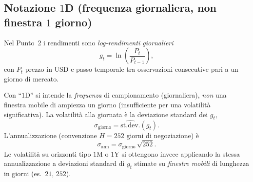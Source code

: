 
\subsection*{Notazione $1$D (frequenza giornaliera, non finestra $1$ giorno)}
Nel Punto~2 i rendimenti sono \emph{log-rendimenti giornalieri}
\[
  g_t = \ln\!\left(\frac{P_t}{P_{t-1}}\right),
\]
con $P_t$ prezzo in USD e passo temporale tra osservazioni consecutive pari a un giorno di mercato.

Con ``$1$D'' si intende la \emph{frequenza} di campionamento (giornaliera), \emph{non} una finestra mobile di ampiezza un giorno (insufficiente per una volatilità significativa). La volatilità alla giornata è la deviazione standard dei $g_t$,
\[
  \sigma_{\mathrm{giorno}} = \widehat{\mathrm{st.dev.}}(g_t).
\]
L'annualizzazione (convenzione $H=252$ giorni di negoziazione) è
\[
  \sigma_{\mathrm{ann}} = \sigma_{\mathrm{giorno}}\,\sqrt{252}.
\]
Le volatilità su orizzonti tipo $1$M o $1$Y si ottengono invece applicando la stessa annualizzazione a deviazioni standard di $g_t$ stimate su \emph{finestre mobili} di lunghezza in giorni (es.\ $21$, $252$).
